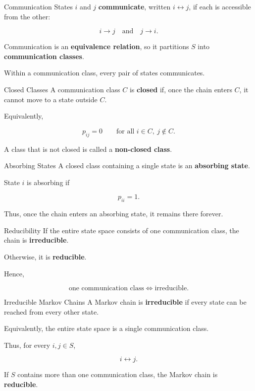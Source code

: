 \documentclass[
  ignorenonframetext,
  aspectratio=169,
]{beamer}
\begin{document}
\begin{frame}{Communication}
\protect{}\label{communication}
States \(i\) and \(j\) \textbf{communicate}, written
\(i\leftrightarrow j\), if each is accessible from the other:

\[
i\rightarrow j
\quad\text{and}\quad
j\rightarrow i.
\]

Communication is an \textbf{equivalence relation}, so it partitions
\(S\) into \textbf{communication classes}.

Within a communication class, every pair of states communicates.
\end{frame}

\begin{frame}{Closed Classes}
\protect{}\label{closed-classes}
A communication class \(C\) is \textbf{closed} if, once the chain enters
\(C\), it cannot move to a state outside \(C\).

Equivalently,

\[
p_{ij}=0
\qquad\text{for all }i\in C,\ j\notin C.
\]

A class that is not closed is called a \textbf{non-closed class}.
\end{frame}

\begin{frame}{Absorbing States}
\protect{}\label{absorbing-states}
A closed class containing a single state is an \textbf{absorbing state}.

State \(i\) is absorbing if

\[
p_{ii}=1.
\]

Thus, once the chain enters an absorbing state, it remains there
forever.
\end{frame}

\begin{frame}{Reducibility}
\protect{}\label{reducibility}
If the entire state space consists of one communication class, the chain
is \textbf{irreducible}.

Otherwise, it is \textbf{reducible}.

Hence,

\[
\boxed{\text{one communication class}\iff\text{irreducible}.}
\]
\end{frame}

\begin{frame}{Irreducible Markov Chains}
\protect{}\label{irreducible-markov-chains}
A Markov chain is \textbf{irreducible} if every state can be reached
from every other state.

Equivalently, the entire state space is a single communication class.

Thus, for every \(i,j\in S\),

\[
i\leftrightarrow j.
\]

If \(S\) contains more than one communication class, the Markov chain is
\textbf{reducible}.
\end{frame}
\end{document}
